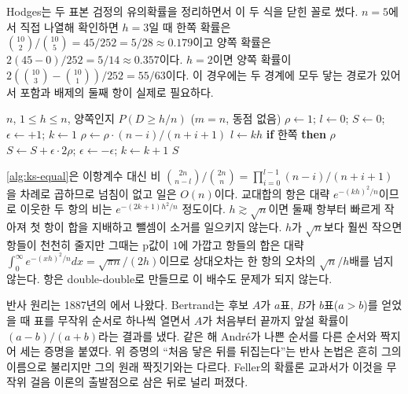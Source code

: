 Hodges는 두 표본 검정의 유의확률을 정리하면서 이 두 식을 닫힌 꼴로 썼다\cite{hodges1958}. $n=5$에서 직접 나열해 확인하면 $h=3$일 때 한쪽 확률은 $\binom{10}2/\binom{10}5=45/252=5/28\approx0.179$이고 양쪽 확률은 $2(45-0)/252=5/14\approx0.357$이다. $h=2$이면 양쪽 확률이 $2(\binom{10}3-\binom{10}1)/252=55/63$이다. 이 경우에는 두 경계에 모두 닿는 경로가 있어서 포함과 배제의 둘째 항이 실제로 필요하다.

\begin{algorithm}[htbp]
\begin{algorithmic}[1]
\Require $n$, $1\le h\le n$, 양쪽인지
\Ensure $P(D\ge h/n)$ ($m=n$, 동점 없음)
\State $\rho\gets1$; $l\gets0$; $S\gets0$; $\epsilon\gets+1$; $k\gets1$
   $\rho\gets\rho\cdot(n-i)/(n+i+1)$ 
  \EndFor
  \State $l\gets kh$
  \State \textbf{if} 한쪽 \textbf{then} \Return $\rho$
  \State $S\gets S+\epsilon\cdot2\rho$; $\epsilon\gets-\epsilon$; $k\gets k+1$
\EndWhile
\State \Return $S$
\end{algorithmic}
\caption{같은 크기 두 표본의 닫힌 꼴 (stardust 의 )}
\label{alg:ks-equal}
\end{algorithm}

\cref{alg:ks-equal}은 이항계수 대신 비 $\binom{2n}{n-l}/\binom{2n}n=\prod_{i=0}^{l-1}(n-i)/(n+i+1)$을 차례로 곱하므로 넘침이 없고 일은 $O(n)$이다. 교대합의 항은 대략 $e^{-(kh)^2/n}$이므로 이웃한 두 항의 비는 $e^{-(2k+1)h^2/n}$ 정도이다. $h\gtrsim\sqrt n$이면 둘째 항부터 빠르게 작아져 첫 항이 합을 지배하고 뺄셈이 소거를 일으키지 않는다. $h$가 $\sqrt n$보다 훨씬 작으면 항들이 천천히 줄지만 그때는 p값이 $1$에 가깝고 항들의 합은 대략 $\int_0^\infty e^{-(xh)^2/n}dx=\sqrt{\pi n}/(2h)$이므로 상대오차는 한 항의 오차의 $\sqrt n/h$배를 넘지 않는다. 항은 double-double로 만들므로 이 배수도 문제가 되지 않는다.

\begin{aside}[투표 문제]
반사 원리는 1887년의 에서 나왔다. Bertrand는 후보 $A$가 $a$표, $B$가 $b$표($a>b$)를 얻었을 때 표를 무작위 순서로 하나씩 열면서 $A$가 처음부터 끝까지 앞설 확률이 $(a-b)/(a+b)$라는 결과를 냈다. 같은 해 André가 나쁜 순서를 다른 순서와 짝지어 세는 증명을 붙였다. 위 증명의 ``처음 닿은 뒤를 뒤집는다''는 반사 논법은 흔히 그의 이름으로 불리지만 그의 원래 짝짓기와는 다르다. Feller의 확률론 교과서가 이것을 무작위 걸음 이론의 출발점으로 삼은 뒤로 널리 퍼졌다\cite{feller1968}.
\end{aside}

